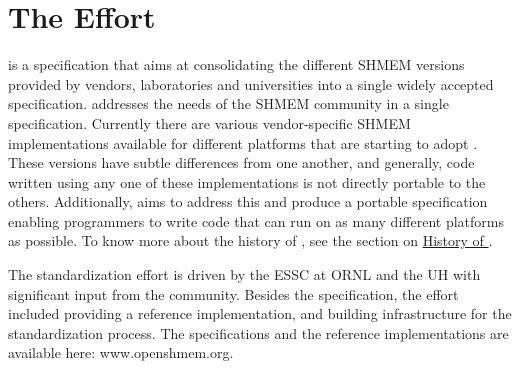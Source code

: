 
\section{The \openshmem Effort}

\openshmem is a specification that aims at consolidating the different
SHMEM versions provided by vendors, laboratories and universities 
into a single widely accepted specification. \openshmem addresses
the needs of the SHMEM community in a single specification. Currently there are various vendor-specific SHMEM implementations available for
different platforms that are starting to adopt \openshmem. These versions have subtle differences from one
another, and generally, code written using any one of these
implementations is not directly portable to the others. Additionally, \openshmem aims to address this and 
produce a portable specification enabling programmers to write
\openshmem code that can run on as many different platforms
as possible. To know more about the history of \openshmem, see the section on \hyperref[sec:openshmem_history]{History of \openshmem}.

The \openshmem standardization effort is driven by the \ac{ESSC} at \ac{ORNL} and the \ac{UH} 
with significant input from the \openshmem{} community. Besides the
specification, the effort included providing a reference implementation,
and building infrastructure for the standardization process.
The specifications and the reference implementations are available here: 
www.openshmem.org. 

